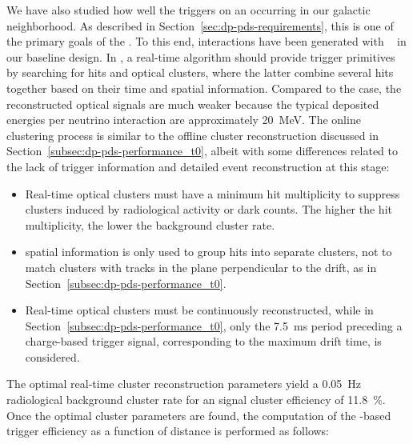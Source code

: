 We have also studied how well the   triggers on an  occurring in our galactic neighborhood. As described in Section~\ref{sec:dp-pds-requirements}, this is one of the primary goals of the . To this end,  \nue {} interactions have been generated with ~\cite{marley} in our baseline  design. In , a real-time algorithm should provide trigger primitives by searching for  hits and optical clusters, where the latter combine several hits together based on their time and spatial information. Compared to the  case, the reconstructed optical signals are much weaker because the typical deposited energies per  neutrino interaction are approximately \SI{20}{\MeV}. The online clustering process is similar to the offline cluster reconstruction discussed in Section~\ref{subsec:dp-pds-performance_t0}, albeit with some differences related to the lack of trigger information and detailed event reconstruction at this stage:
%
\begin{itemize}
\item Real-time optical clusters must have a minimum hit multiplicity to suppress clusters induced by radiological activity or  dark counts. The higher the hit multiplicity, the lower the background cluster rate.
\item {} spatial information is only used to group hits into separate clusters,  not to match  clusters with  tracks in the plane perpendicular to the drift, as in Section~\ref{subsec:dp-pds-performance_t0}.
\item Real-time optical clusters must be continuously reconstructed, while in Section~\ref{subsec:dp-pds-performance_t0}, only the \SI{7.5}{\milli\s} period preceding a charge-based trigger signal, corresponding to the maximum drift time, is considered.
\end{itemize}
%
The optimal real-time cluster reconstruction parameters yield a \SI{0.05}{\Hz} radiological background cluster rate for an  \nue {} signal cluster efficiency of \SI{11.8}{\%}. Once the optimal cluster parameters are found, the computation of the -based  trigger efficiency as a function of  distance is performed as follows:

